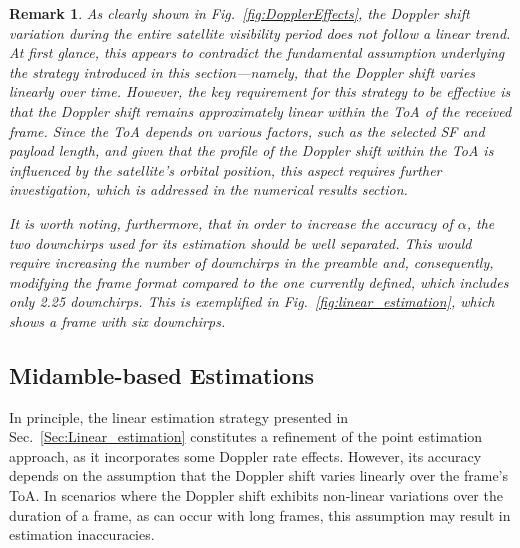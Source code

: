 \documentclass{IEEEtran}
\newtheorem{remark}{Remark}
\begin{document}
\begin{remark}
As clearly shown in Fig.~\ref{fig:DopplerEffects}, the Doppler shift variation during the entire satellite visibility period does not follow a linear trend. At first glance, this appears to contradict the fundamental assumption underlying the strategy introduced in this section---namely, that the Doppler shift varies linearly over time. However, the key requirement for this strategy to be effective is that the Doppler shift remains approximately linear within the \ac{ToA} of the received frame. Since the \ac{ToA} depends on various factors, such as the selected SF and payload length, and given that the profile of the Doppler shift within the \ac{ToA} is influenced by the satellite’s orbital position, this aspect requires further investigation, which is addressed in the numerical results section.

It is worth noting, furthermore, that in order to increase the accuracy of $\alpha$, the two downchirps used for its estimation should be well separated. This would require increasing the number of downchirps in the preamble and, consequently, modifying the frame format compared to the one currently defined, which includes only 2.25  downchirps. This is exemplified in Fig.~\ref{fig:linear_estimation}, which shows a frame with six downchirps.
\end{remark}

\subsection{Midamble-based Estimations}

In principle, the linear estimation strategy presented in Sec.~\ref{Sec:Linear_estimation} constitutes a refinement of the point estimation approach, as it incorporates some Doppler rate effects. However, its accuracy depends on the assumption that the Doppler shift varies linearly over the frame's \ac{ToA}. In scenarios where the Doppler shift exhibits non-linear variations over the duration of a frame, as can occur with long frames, this assumption may result in estimation inaccuracies.
\end{document}
